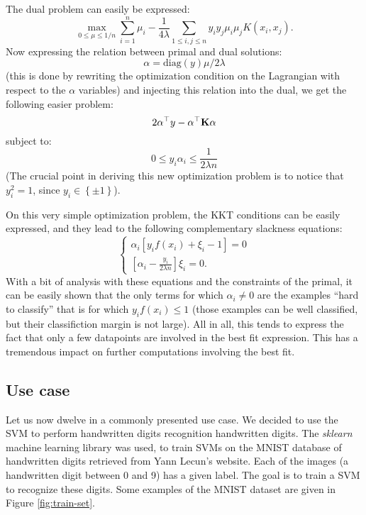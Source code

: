 \documentclass[a4paper, 11pt]{article}
\newcommand{\K}{\bold{K}}
\newcommand{\pmset}{\left\{\pm1\right\}}
\begin{document}
The dual problem can easily be expressed:
\begin{equation}
  \max\limits_{0\leq\mu\leq 1/n}
  \sum\limits_{i=1}^n\mu_i
  - \frac{1}{4\lambda}\sum\limits_{1\leq i,j \leq n}y_iy_j\mu_i\mu_jK(x_i, x_j).
\end{equation}
Now expressing the relation between primal and dual solutions:
\begin{equation}
  \alpha = \text{diag}(y)\mu/2\lambda
\end{equation}
(this is done by rewriting the optimization condition on the
Lagrangian with respect to the $\alpha$ variables)
and injecting this relation into the dual, we get the following
easier problem:
\begin{equation}
  2\alpha^\top y - \alpha^\top \K \alpha
\end{equation}
subject to:
\begin{equation}
  0 \leq y_i\alpha_i \leq \frac{1}{2\lambda n}
\end{equation}
(The crucial point in deriving this new optimization problem is
to notice that $y_i^2 = 1$, since $y_i \in \pmset$).

On this very simple optimization problem, the KKT conditions can
be easily expressed, and they lead to the following complementary
slackness equations:
\begin{equation}
  \begin{cases}
    \alpha_i\left[y_if(x_i) + \xi_i - 1\right] = 0\\
    \left[\alpha_i - \frac{y_i}{2\lambda n}\right]\xi_i = 0.
  \end{cases}
\end{equation}
With a bit of analysis with these equations and the constraints
of the primal, it can be easily shown that the only terms for
which $\alpha_i \neq 0$ are the examples ``hard to classify'' that
is for which $y_i f(x_i) \leq 1$ (those examples can be well
classified, but their classifiction margin is not large). All in
all, this tends to express the fact that only a few datapoints
are involved in the best fit expression. This has a tremendous
impact on further computations involving the best fit.

\subsection{Use case}

Let us now dwelve in a commonly presented use case. We decided to use the SVM
to perform handwritten digits recognition handwritten digits.  The {\it
sklearn}\cite{python} machine learning library was used, to train SVMs on the
MNIST database of handwritten digits\cite{mnist} retrieved from Yann Lecun's
website.  Each of the images (a handwritten digit between 0 and 9) has a given
label. The goal is to train a SVM to  recognize these digits. Some examples of
the MNIST dataset are given in
Figure \ref{fig:train-set}. 
\end{document}
